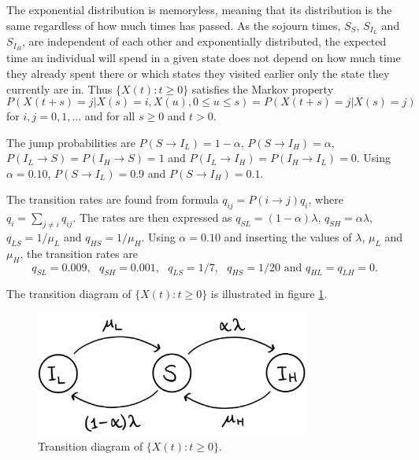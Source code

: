 
The exponential distribution is memoryless, meaning that its distribution is the same regardless of how much times has passed. As the sojourn times, $S_S$, $S_{I_L}$ and $S_{I_H}$, are independent of each other and exponentially distributed, the expected time an individual will spend in a given state does not depend on how much time they already spent there or which states they visited earlier only the state they currently are in. Thus $\{X(t):t \geq 0 \}$  satisfies the Markov property
$$P(X(t+s)=j|X(s)=i, X(u), 0 \leq u \leq s)=P(X(t+s)=j|X(s)=j)$$ 
for $i,j = 0,1,...$ and for all $s \geq 0$ and $t >0 $.

The jump probabilities are $P(S \rightarrow I_L)= 1 - \alpha$, $P(S \rightarrow I_H)= \alpha$, $P(I_L \rightarrow S)= P(I_H \rightarrow S) = 1$ and $P(I_L \rightarrow I_H)= P(I_H \rightarrow I_L) = 0$. Using $\alpha = 0.10$, $P(S \rightarrow I_L)= 0.9$ and $P(S \rightarrow I_H)= 0.1$. 

The transition rates are found from formula $q_{ij} = P(i \rightarrow j ) q_i$, where $q_i = \sum_{j \neq i} q_{ij}$. The rates are then expressed as $q_{SL} = (1-\alpha)\lambda $, $q_{SH} = \alpha \lambda$, $q_{LS} = 1/\mu_L$ and $q_{HS} = 1/\mu_H$. Using $\alpha = 0.10$ and inserting the values of $\lambda$, $\mu_L$ and $\mu_H$, the transition rates are 
$$q_{SL} = 0.009,\text{ } q_{SH} = 0.001, \text{ } q_{LS} = 1/7, \text{ } q_{HS} = 1/20 \text{ and } q_{HL}=q_{LH}=0.$$

The transition diagram of $\{X(t):t \geq 0 \}$ is illustrated in figure \ref{transdiagramA}. 

\begin{figure}
    \centering
    \includegraphics[width=90mm]{TransDiag1A.png}
    \caption{Transition diagram of $\{X(t):t\geq0\}$.}
    \label{transdiagramA}
\end{figure}




